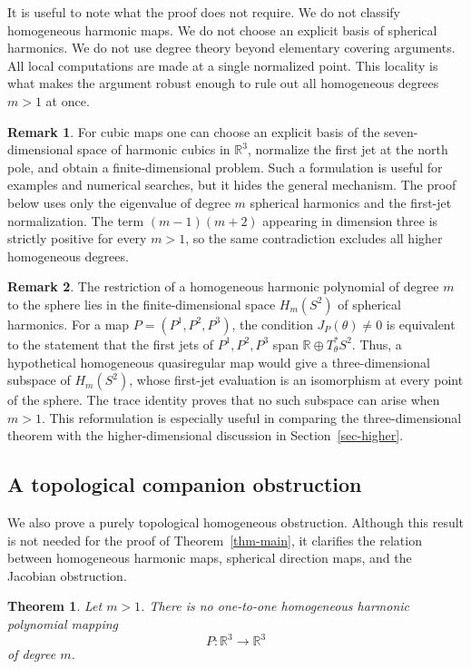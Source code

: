 \documentclass[10pt]{amsart}
\numberwithin{equation}{section}
\newtheorem{theorem}{Theorem}[section]
\theoremstyle{definition}
\newtheorem{remark}{Remark}[section]
\newcommand{\R}{\mathbb R}
\begin{document}
It is useful to note what the proof does not require. We do not classify
homogeneous harmonic maps. We do not choose an explicit basis of spherical
harmonics. We do not use degree theory beyond elementary covering arguments.
All local computations are made at a single normalized point. This locality is
what makes the argument robust enough to rule out all homogeneous degrees
\(m>1\) at once.

\begin{remark}
For cubic maps one can choose an explicit basis of the seven-dimensional space
of harmonic cubics in \(\R^3\), normalize the first jet at the north pole, and
obtain a finite-dimensional problem. Such a formulation is useful for examples
and numerical searches, but it hides the general mechanism. The proof below
uses only the eigenvalue of degree \(m\) spherical harmonics and the first-jet
normalization. The term \((m-1)(m+2)\) appearing in dimension three is strictly
positive for every \(m>1\), so the same contradiction excludes all higher
homogeneous degrees.
\end{remark}


\begin{remark}
The restriction of a homogeneous harmonic polynomial of degree \(m\) to the
sphere lies in the finite-dimensional space \(H_m(S^2)\) of spherical
harmonics. For a map \(P=(P^1,P^2,P^3)\), the condition \(J_P(\theta)\ne0\) is
equivalent to the statement that the first jets of \(P^1,P^2,P^3\) span
\(\R\oplus T_\theta^*S^2\). Thus, a hypothetical homogeneous quasiregular map
would give a three-dimensional subspace of \(H_m(S^2)\), whose first-jet
evaluation is an isomorphism at every point of the sphere. The trace identity
proves that no such subspace can arise when \(m>1\). This reformulation is
especially useful in comparing the three-dimensional theorem with the
higher-dimensional discussion in Section~\ref{sec-higher}.
\end{remark}

\subsection{A topological companion obstruction}

We also prove a purely topological homogeneous obstruction. Although this
result is not needed for the proof of Theorem~\ref{thm-main}, it clarifies the
relation between homogeneous harmonic maps, spherical direction maps, and the
Jacobian obstruction.

\begin{theorem}
\label{thm-homogeneous-noninjectivity}
Let \(m>1\). There is no one-to-one homogeneous harmonic polynomial mapping
\[
        P:\R^3\to\R^3
\]
of degree \(m\).
\end{theorem}
\end{document}
